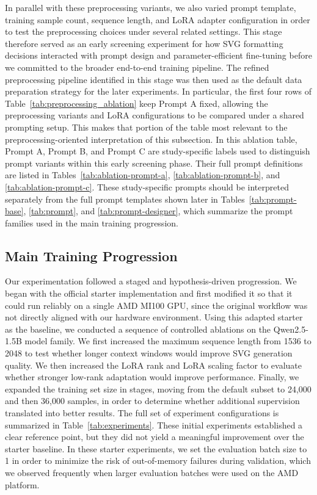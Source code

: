 \documentclass[11pt]{article}
\begin{document}
In parallel with these preprocessing variants, we also varied prompt
template, training sample count, sequence length, and LoRA adapter
configuration in order to test the preprocessing choices under several related
settings. This stage therefore served as an early screening experiment for how
SVG formatting decisions interacted with prompt design and parameter-efficient
fine-tuning before we committed to the broader end-to-end training pipeline.
The refined preprocessing pipeline identified in this stage was then used as
the default data preparation strategy for the later experiments. In
particular, the first four rows of Table~\ref{tab:preprocessing_ablation}
keep Prompt A fixed, allowing the preprocessing variants and LoRA
configurations to be compared under a shared prompting setup. This makes that
portion of the table most relevant to the preprocessing-oriented
interpretation of this subsection. In this ablation table, Prompt A, Prompt B,
and Prompt C are study-specific labels used to distinguish prompt variants
within this early screening phase. Their full prompt definitions are listed in
Tables~\ref{tab:ablation-prompt-a}, \ref{tab:ablation-prompt-b}, and
\ref{tab:ablation-prompt-c}. These study-specific prompts should be
interpreted separately from the full prompt templates shown later in
Tables~\ref{tab:prompt-base}, \ref{tab:prompt}, and
\ref{tab:prompt-designer}, which summarize the prompt families used in the
main training progression.

\subsection{Main Training Progression}

Our experimentation followed a staged and hypothesis-driven progression. We
began with the official starter implementation and first modified it so that
it could run reliably on a single AMD MI100 GPU, since the original workflow
was not directly aligned with our hardware environment. Using this adapted
starter as the baseline, we conducted a sequence of controlled ablations on
the Qwen2.5-1.5B model family. We first increased the maximum sequence length
from 1536 to 2048 to test whether longer context windows would improve SVG
generation quality. We then increased the LoRA rank and LoRA scaling factor to
evaluate whether stronger low-rank adaptation would improve performance.
Finally, we expanded the training set size in stages, moving from the default
subset to 24,000 and then 36,000 samples, in order to determine whether
additional supervision translated into better results. The full set of
experiment configurations is summarized in Table~\ref{tab:experiments}. These
initial experiments established a clear reference point, but they did not
yield a meaningful improvement over the starter baseline. In these starter
experiments, we set the evaluation batch size to 1 in order to minimize the
risk of out-of-memory failures during validation, which we observed
frequently when larger evaluation batches were used on the AMD platform.
\end{document}
